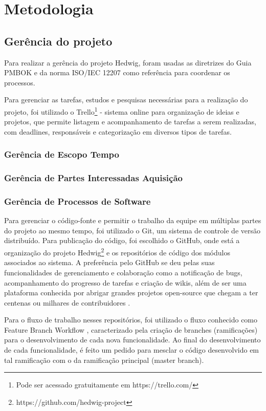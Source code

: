 \chapter{Metodologia}

\section{Gerência do projeto}
Para realizar a gerência do projeto Hedwig, foram usadas as diretrizes do Guia PMBOK \cite{pmi} e da norma ISO/IEC 12207 \cite{iso12207} como referência para coordenar os processos.

Para gerenciar as tarefas, estudos e pesquisas necessárias para a realização do projeto, foi utilizado o Trello\footnote{Pode ser acessado gratuitamente em https://trello.com/} - sistema online para organização de ideias e projetos, que permite listagem e acompanhamento de tarefas a serem realizadas, com deadlines, responsáveis e categorização em diversos tipos de tarefas.

\subsection{Gerência de Escopo Tempo}
\subsection{Gerência de Partes Interessadas Aquisição}
\subsection{Gerência de Processos de Software}
Para gerenciar o código-fonte e permitir o trabalho da equipe em múltiplas partes do projeto ao mesmo tempo, foi utilizado o Git, um sistema de controle de versão distribuído. Para publicação do código, foi escolhido o GitHub, onde está a organização do projeto Hedwig\footnote{https://github.com/hedwig-project} e os repositórios de código dos módulos associados ao sistema. A preferência pelo GitHub se deu pelas suas funcionalidades de gerenciamento e colaboração como a notificação de bugs, acompanhamento do progresso de tarefas e criação de wikis, além de ser uma plataforma conhecida por abrigar grandes projetos open-source que chegam a ter centenas ou milhares de contribuidores \cite{github}.

Para o fluxo de trabalho nesses repositórios, foi utilizado o fluxo conhecido como Feature Branch Workflow \cite{atlassian}, caracterizado pela criação de branches (ramificações) para o desenvolvimento de cada nova funcionalidade. Ao final do desenvolvimento de cada funcionalidade, é feito um pedido para mesclar o código desenvolvido em tal ramificação com o da ramificação principal (master branch).

